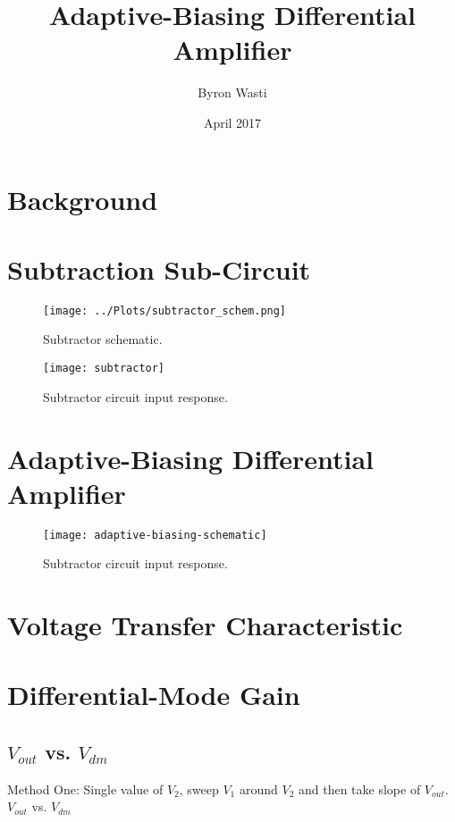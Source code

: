\documentclass{article}
\title{Adaptive-Biasing Differential Amplifier}
\author{Byron Wasti}
\date{April 2017}
\begin{document}
\maketitle

\section{Background}

\section{Subtraction Sub-Circuit}

\begin{figure}[ht!]
    \centering
    \texttt{[image: ../Plots/subtractor\_schem.png]}
    \caption{Subtractor schematic.}
    \label{fig:postlab9}
\end{figure}

\begin{figure}[ht!]
    \centering
    \texttt{[image: subtractor]}
    \caption{Subtractor circuit input response.}
    \label{fig:postlab9}
\end{figure}

\section{Adaptive-Biasing Differential Amplifier}

\begin{figure}[ht!]
    \centering
    \texttt{[image: adaptive-biasing-schematic]}
    \caption{Subtractor circuit input response.}
    \label{fig:schematic-adaptive}
\end{figure}


\section{Voltage Transfer Characteristic}


\section{Differential-Mode Gain}

\subsection{$V_{out}$ vs. $V_{dm}$}

Method One:
Single value of $V_2$, sweep $V_1$ around $V_2$ and then take slope of $V_{out}$. $V_{out}$ vs. $V_{dm}$
\end{document}
